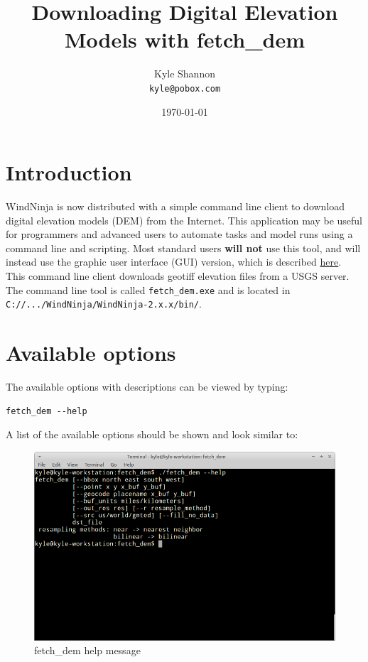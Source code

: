 \documentclass[12pt,oneside,final]{article}
\title{Downloading Digital Elevation Models with fetch\_dem}
\author{Kyle Shannon \\
\texttt{kyle@pobox.com}}
\date{\today}
\begin{document}
\maketitle

\section{Introduction}
WindNinja is now distributed with a simple command line client to download
digital elevation models (DEM) from the Internet.  This application may be
useful for programmers and advanced users to automate tasks and model runs using a
command line and scripting.
Most standard users \textbf{will not} use this tool, and will instead use the graphic
user interface (GUI) version, which is described
\href{run:./download_elevation_file.pdf}{here}.  This
command line client downloads geotiff elevation files from
a USGS server.  The command line tool is called \texttt{fetch\_dem.exe} and
is located in \texttt{C://.../WindNinja/WindNinja-2.x.x/bin/}.
\section{Available options}
The available options with descriptions can be viewed by typing:
\begin{verbatim}fetch_dem --help\end{verbatim}
A list of the available options should be shown and look similar to:
\begin{figure}[ht!]
    \centering
    \includegraphics[width=5in]{images/fetch_dem_1.png}
    \caption{fetch\_dem help message}
\end{figure}
\end{document}
